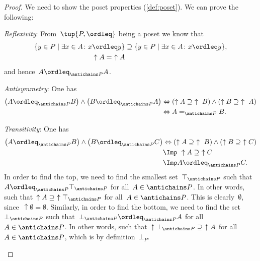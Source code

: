 \begin{proof}
We need to show the poset properties (\cref{def:poset}).
We can prove the following:
\begin{compactitem}
\item \emph{Reflexivity}: From~$\tup{P,\ordleq}$ being a poset we know that 
\begin{equation}
\begin{aligned}
\{y\in P \mid \exists x\in A \colon x\ordleq y\} &\supseteq \{y\in P \mid \exists x\in A \colon x\ordleq y\},\\
\uparrow A =\ \uparrow A
\end{aligned}
\end{equation}
and hence~$A\ordleq_{\antichains P}A$.
\item \emph{Antisymmetry}: One has
\begin{equation}
    \begin{aligned}
    \left(A\ordleq_{\antichains P} B\right) \wedge \left(B\ordleq_{\antichains P} A\right)
    &\Leftrightarrow \left(\uparrow A \supseteq \ \uparrow \ B\right) \wedge \left( \uparrow  B\supseteq \ \uparrow \ A\right)\\
    &\Leftrightarrow A=_{\antichains P} B.
    \end{aligned}
\end{equation}
\item \emph{Transitivity}: One has
\begin{equation}
    \begin{aligned}
    \left(A\ordleq_{\antichains P} B\right) \wedge \left(B\ordleq_{\antichains P} C\right)&\Leftrightarrow  \left(\uparrow A \supseteq \ \uparrow \ B\right) \wedge \left( \uparrow  B\supseteq \ \uparrow C\right)\\
    &\Imp \ \uparrow A\supseteq \ \uparrow C\\
    &\Imp A\ordleq_{\antichains P}C.
    \end{aligned}
\end{equation}
In order to find the top, we need to find the smallest set~$\top_{\antichains P}$ such that~$A\ordleq_{\antichains P} \top_{\antichains P}$ for all~$A\in \antichains P$. In other words, such that~$\uparrow A\supseteq \ \uparrow \top_{\antichains P}$ for all~$A\in \antichains P$. This is clearly~$\emptyset$, since~$\uparrow \emptyset = \emptyset$. Similarly, in order to find the bottom, we need to find the set~$\bot_{\antichains P}$ such that~$\bot_{\antichains P} \ordleq_{\antichains P} A$ for all~$A\in \antichains P$. In other words, such that~$\uparrow \bot_{\antichains P} \supseteq \ \uparrow A$ for all~$A\in \antichains P$, which is by definition~$\bot_P$.
\end{compactitem}
\end{proof}